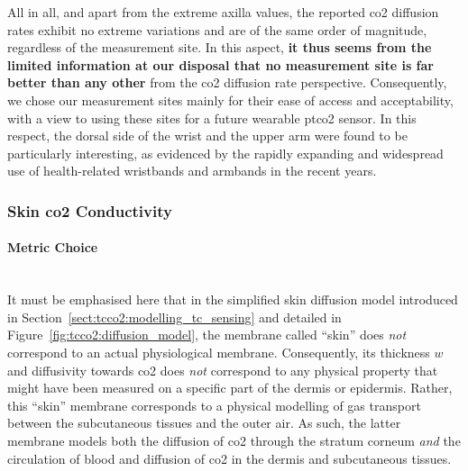 All in all, and apart from the extreme axilla values, the reported \gls{co2} diffusion rates exhibit no extreme variations and are of the same order of magnitude, regardless of the measurement site. In this aspect, \textbf{it thus seems from the limited information at our disposal that no measurement site is far better than any other} from the \gls{co2} diffusion rate perspective. Consequently, we chose our measurement sites mainly for their ease of access and acceptability, with a view to using these sites for a future wearable \gls{ptco2} sensor. In this respect, the dorsal side of the wrist and the upper arm were found to be particularly interesting, as evidenced by the rapidly expanding and widespread use of health-related wristbands and armbands in the recent years\cite{eidan2018, soon2020, cosoli2020}.

\subsubsection{Skin \texorpdfstring{\gls{co2}}{CO2} Conductivity}

\paragraph{Metric Choice}\label{sect:tcco2:k_metric_choice}\mbox{}\\

It must be emphasised here that in the simplified skin diffusion model introduced in Section~\ref{sect:tcco2:modelling_tc_sensing} and detailed in Figure~\ref{fig:tcco2:diffusion_model}, the membrane called \enquote{skin} does \emph{not} correspond to an actual physiological membrane. Consequently, its thickness $w$ and diffusivity towards \gls{co2} does \emph{not} correspond to any physical property that might have been measured on a specific part of the dermis or epidermis. Rather, this \enquote{skin} membrane corresponds to a physical modelling of gas transport between the subcutaneous tissues and the outer air. As such, the latter membrane models both the diffusion of \gls{co2} through the stratum corneum \emph{and} the circulation of blood and diffusion of \gls{co2} in the dermis and subcutaneous tissues.

